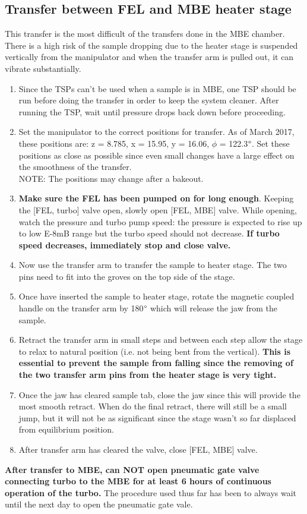 \subsection{Transfer between FEL and MBE heater stage}
This transfer is the most difficult of the transfers done in the MBE chamber. There is a high risk of the sample dropping due to the heater stage is suspended vertically from the manipulator and when the transfer arm is pulled out, it can vibrate substantially.

\begin{enumerate}
	\item Since the TSPs can't be used when a sample is in MBE, one TSP should be run before doing the transfer in order to keep the system cleaner. After running the TSP, wait until pressure drops back down before proceeding.
	\item   Set the manipulator to the correct positions for transfer. As of March 2017, these positions are: z = 8.785, x = 15.95, y = 16.06, $\phi$ = 122.3$\degree$. Set these positions as close as possible since even small changes have a large effect on the smoothness of the transfer.\\
	NOTE: The positions may change after a bakeout.
	\item \textbf{Make sure the FEL has been pumped on for long enough}. Keeping the [FEL, turbo] valve open, slowly open [FEL, MBE] valve. While opening, watch the pressure and turbo pump speed: the pressure is expected to rise up to low E-8mB range but the turbo speed should not decrease. \textbf {If turbo speed decreases, immediately stop and close valve.}
	\item Now use the transfer arm to transfer the sample to heater stage. The two pins need to fit into the groves on the top side of the stage. 
	\item Once have inserted the sample to heater stage, rotate the magnetic coupled handle on the transfer arm by 180$\degree$ which will release the jaw from the sample. 
	\item Retract the transfer arm in small steps and between each step allow the stage to relax to natural position (i.e. not being bent from the vertical). \textbf {This is essential to prevent the sample from falling since the removing of the two transfer arm pins from the heater stage is very tight.} 
	\item Once the jaw has cleared sample tab, close the jaw since this will provide the most smooth retract. When do the final retract, there will still be a small jump, but it will not be as significant since the stage wasn't so far displaced from equilibrium position.	
	\item After transfer arm has cleared the valve, close [FEL, MBE] valve.
\end{enumerate}
\textbf{After transfer to MBE, can NOT open pneumatic gate valve connecting turbo to the  MBE for at least 6 hours of continuous operation of the turbo.} The procedure used thus far has been to always wait until the next day to open the pneumatic gate vale.

